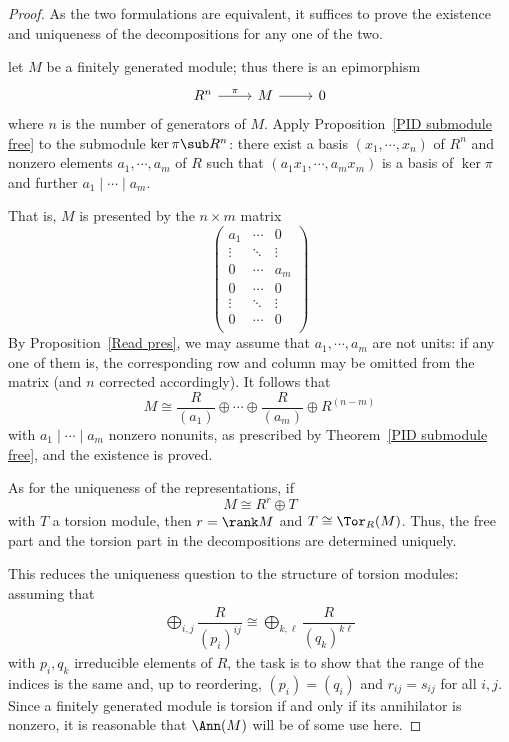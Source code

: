 \begin{proof}
As the two formulations are equivalent, it suffices to prove the existence and uniqueness of the decompositions for any one of the two.\par
let $M$ be a finitely generated module; thus there is an epimorphism
\[\begin{tikzcd}
R^{n}\ar[r,"\pi"]&M\ar[r]&0
\end{tikzcd}\]
where $n$ is the number of generators of $M$. Apply Proposition~\ref{PID submodule free} to the submodule $\ker\pi\sub R^n$: there exist a basis $(x_1,\cdots,x_n)$ of $R^n$ and nonzero elements $a_1,\cdots,a_m$ of $R$ such that $(a_1x_1,\cdots,a_mx_m)$ is a basis of $\ker\pi$ and further $a_1\mid\cdots\mid a_m$.\par
That is, $M$ is presented by the $n\times m$ matrix
\[\begin{pmatrix}
a_1&\cdots&0\\
\vdots&\ddots&\vdots\\
0&\cdots&a_m\\
0&\cdots&0\\
\vdots&\ddots&\vdots\\
0&\cdots&0\\
\end{pmatrix}\]
By Proposition~\ref{Read pres}, we may assume that $a_1,\cdots,a_m$ are not units: if any one of
them is, the corresponding row and column may be omitted from the matrix (and $n$ corrected accordingly). It follows that
\[M\cong\dfrac{R}{(a_1)}\oplus\cdots\oplus\dfrac{R}{(a_m)}\oplus R^{(n-m)}\]
with $a_1\mid\cdots\mid a_m$ nonzero nonunits, as prescribed by Theorem~\ref{PID submodule free}, and the existence is proved.\par
As for the uniqueness of the representations, if
\[M\cong R^r\oplus T\]
with $T$ a torsion module, then $r=\rank M$ and $T\cong\Tor_R(M)$. Thus, the free part and the torsion part in the decompositions are determined uniquely.\par
This reduces the uniqueness question to the structure of torsion modules: assuming that
\begin{align}\label{Two compo modu}
\bigoplus_{i,j}\dfrac{R}{(p_i)^{ij}}\cong\bigoplus_{k,\ell}\dfrac{R}{(q_k)^{k\ell}}
\end{align}
with $p_i,q_k$ irreducible elements of $R$, the task is to show that the range of the indices is the same and, up to reordering, $(p_i)=(q_i)$ and $r_{ij}=s_{ij}$ for all $i,j$. Since a finitely generated module is torsion if and only if its annihilator is nonzero, it is reasonable that $\Ann(M)$ will be of some use here.

\end{proof}
